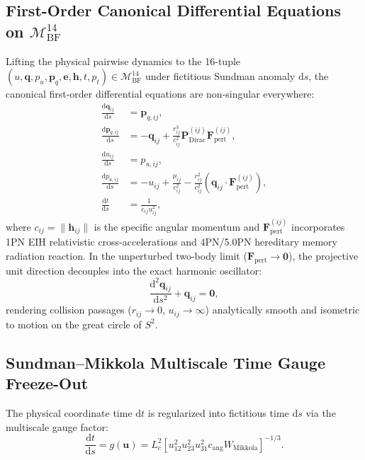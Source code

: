 \documentclass[11pt,a4paper,reqno]{article}
\theoremstyle{plain}
\theoremstyle{definition}
\theoremstyle{remark}
\numberwithin{equation}{section}
\newcommand{\Mbf}{\mathcal{M}_{\mathrm{BF}}^{14}}
\providecommand{\diff}{\mathrm{d}}
\begin{document}
\subsection{First-Order Canonical Differential Equations on \texorpdfstring{$\Mbf$}{M\_BF\textasciicircum 14}}
\label{subsec:bf_canonical_odes}
Lifting the physical pairwise dynamics to the 16-tuple $(u, \mathbf{q}, p_u, \mathbf{p}_q, \mathbf{e}, \mathbf{h}, t, p_t) \in \Mbf$ under fictitious Sundman anomaly $\diff s$, the canonical first-order differential equations are non-singular everywhere:
\begin{align}
  \frac{\diff \mathbf{q}_{ij}}{\diff s} &= \mathbf{p}_{q,ij}, \label{eq:bf_ode_q} \\
  \frac{\diff \mathbf{p}_{q,ij}}{\diff s} &= - \mathbf{q}_{ij} + \frac{r_{ij}^3}{c_{ij}^2} \mathbf{P}_{\mathrm{Dirac}}^{(ij)} \mathbf{F}_{\mathrm{pert}}^{(ij)}, \label{eq:bf_ode_pq} \\
  \frac{\diff u_{ij}}{\diff s} &= p_{u,ij}, \label{eq:bf_ode_u} \\
  \frac{\diff p_{u,ij}}{\diff s} &= - u_{ij} + \frac{\mu_{ij}}{c_{ij}^2} - \frac{r_{ij}^2}{c_{ij}^2} (\mathbf{q}_{ij} \cdot \mathbf{F}_{\mathrm{pert}}^{(ij)}), \label{eq:bf_ode_pu} \\
  \frac{\diff t}{\diff s} &= \frac{1}{c_{ij} u_{ij}^2}, \label{eq:bf_ode_t}
\end{align}
where $c_{ij} = \|\mathbf{h}_{ij}\|$ is the specific angular momentum and $\mathbf{F}_{\mathrm{pert}}^{(ij)}$ incorporates 1PN EIH relativistic cross-accelerations and 4PN/5.0PN hereditary memory radiation reaction. In the unperturbed two-body limit ($\mathbf{F}_{\mathrm{pert}} \to \mathbf{0}$), the projective unit direction decouples into the exact harmonic oscillator:
\begin{equation}
  \frac{\diff^2 \mathbf{q}_{ij}}{\diff s^2} + \mathbf{q}_{ij} = \mathbf{0},
  \label{eq:harmonic_oscillator_exact}
\end{equation}
rendering collision passages ($r_{ij} \to 0$, $u_{ij} \to \infty$) analytically smooth and isometric to motion on the great circle of $S^2$.

\subsection{Sundman--Mikkola Multiscale Time Gauge Freeze-Out}
\label{subsec:sundman_mikkola_gauge}
The physical coordinate time $\mathrm{d}t$ is regularized into fictitious time $\mathrm{d}s$ via the multiscale gauge factor:
\begin{equation}
  \frac{\mathrm{d}t}{\mathrm{d}s} = g(\mathbf{u}) = L_c^2 \left[ u_{12}^2 u_{23}^2 u_{31}^2 c_{\mathrm{ang}} W_{\mathrm{Mikkola}} \right]^{-1/3}.
  \label{eq:multiscale_sundman_gauge}
\end{equation}
\end{document}

